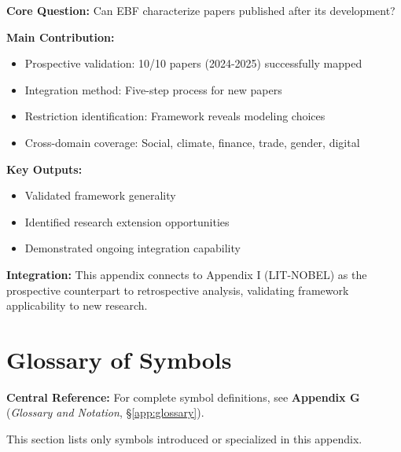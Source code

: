 \begin{tcolorbox}[colback=green!10!white, colframe=green!75!black,
    title=\textbf{Appendix J: Summary}]

\textbf{Core Question:} Can EBF characterize papers published after its
development?

\textbf{Main Contribution:}
\begin{itemize}[nosep]
    \item Prospective validation: 10/10 papers (2024-2025) successfully mapped
    \item Integration method: Five-step process for new papers
    \item Restriction identification: Framework reveals modeling choices
    \item Cross-domain coverage: Social, climate, finance, trade, gender, digital
\end{itemize}

\textbf{Key Outputs:}
\begin{itemize}[nosep]
    \item Validated framework generality
    \item Identified research extension opportunities
    \item Demonstrated ongoing integration capability
\end{itemize}

\textbf{Integration:} This appendix connects to Appendix I (LIT-NOBEL) as
the prospective counterpart to retrospective analysis, validating framework
applicability to new research.

\end{tcolorbox}


\section{Glossary of Symbols}
\label{sec:J-glossary}

\begin{tcolorbox}[colback=blue!5!white, colframe=blue!75!black]
\textbf{Central Reference:} For complete symbol definitions, see
\textbf{Appendix G} (\textit{Glossary and Notation}, \S\ref{app:glossary}).

This section lists only symbols introduced or specialized in this appendix.
\end{tcolorbox}

\vspace{0.5em}


